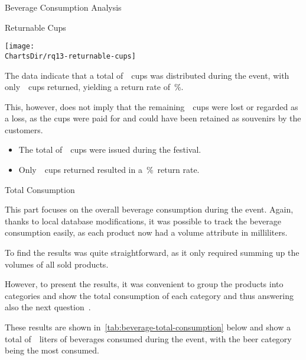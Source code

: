 \begin{section}{Beverage Consumption Analysis}
\begin{subsection}{Returnable Cups}
		\begin{chart}[h]
			\centering
			\texttt{[image: \\ChartsDir/rq13-returnable-cups]}
			\caption{ Returnable Cups}
			\label{chart:returnable-cups}
			\source
		\end{chart}

		The data indicate that a total of~~cups was distributed during the event, with only~~cups returned, yielding a return rate of~\%.

		This, however, does not imply that the remaining~~cups were lost or regarded as a loss, as the cups were paid for and could have been retained as souvenirs by the customers.

		\begin{keytakeaways}
			\begin{itemize}
				\item The total of~~cups were issued during the festival.
				\item Only~~cups returned resulted in a~\%~return rate.
			\end{itemize}
		\end{keytakeaways}
	\end{subsection}

	\begin{subsection}{Total Consumption}
		\label{subsec:analysis-beverage-total-consumption}

		This part focuses on the overall beverage consumption during the event.
		Again, thanks to local database modifications, it was possible to track the beverage consumption easily, as each product now had a volume attribute in milliliters.


		To find the results was quite straightforward, as it only required summing up the volumes of all sold products.

		However, to present the results, it was convenient to group the products into categories and show the total consumption of each category and thus answering also the next question~.


		These results are shown in~\autoref{tab:beverage-total-consumption} below and show a total of~\bfmtnum{}~liters of beverages consumed during the event, with the beer category being the most consumed.


\end{subsection}
\end{section}

